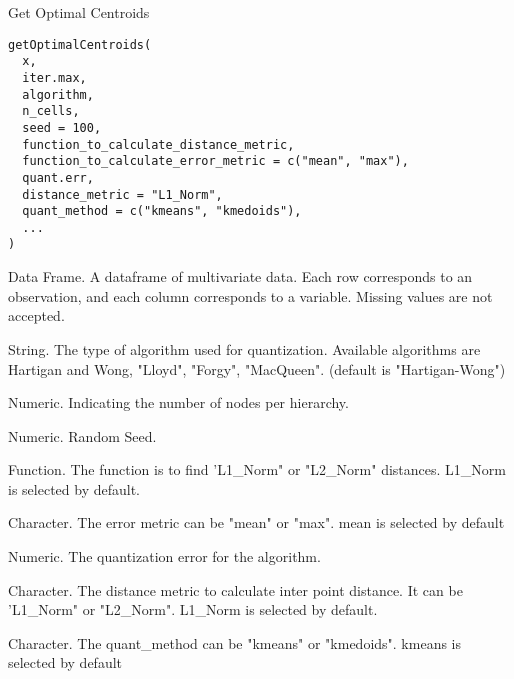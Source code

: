 \documentclass[letterpaper]{book}
\begin{document}
%
\begin{Description}
Get Optimal Centroids
\end{Description}
%
\begin{Usage}
\begin{verbatim}
getOptimalCentroids(
  x,
  iter.max,
  algorithm,
  n_cells,
  seed = 100,
  function_to_calculate_distance_metric,
  function_to_calculate_error_metric = c("mean", "max"),
  quant.err,
  distance_metric = "L1_Norm",
  quant_method = c("kmeans", "kmedoids"),
  ...
)
\end{verbatim}
\end{Usage}
%
\begin{Arguments}
\begin{ldescription}
\item[\code{x}] Data Frame. A dataframe of multivariate data. Each row corresponds to an
observation, and each column corresponds to a variable. Missing values are
not accepted.

\item[\code{algorithm}] String. The type of algorithm used for quantization.
Available algorithms are Hartigan and Wong, "Lloyd", "Forgy", "MacQueen".
(default is "Hartigan-Wong")

\item[\code{n\_cells}] Numeric. Indicating the number of nodes per hierarchy.

\item[\code{seed}] Numeric. Random Seed.

\item[\code{function\_to\_calculate\_distance\_metric}] Function. The function is to find 'L1\_Norm" or "L2\_Norm" distances. L1\_Norm is selected by default.

\item[\code{function\_to\_calculate\_error\_metric}] Character. The error metric can be "mean" or "max". mean is selected by default

\item[\code{quant.err}] Numeric. The quantization error for the algorithm.

\item[\code{distance\_metric}] Character. The distance metric to calculate inter point distance. It can be 'L1\_Norm" or "L2\_Norm". L1\_Norm is selected by default.

\item[\code{quant\_method}] Character. The quant\_method can be "kmeans" or "kmedoids". kmeans is selected by default
\end{ldescription}
\end{Arguments}
\end{document}
